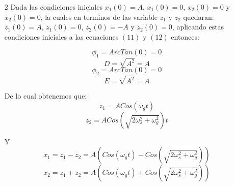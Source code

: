 \documentclass[a4paper]{article}
\begin{document}
\begin{answer}
\begin{enumerate}
    \item[2] Dada las condiciones iniciales $x_1(0) = A$, $\dot{x_1}(0) =0  $, $x_2(0) = 0$ y $\dot{x}_2(0)=0$, la cuales en terminos de las variable $z_1$ y $z_2$ quedaran: 
    $z_1(0) = A$, $\dot{z}_1(0) = 0$, $z_2(0) = -A$ y $\dot{z}_2(0) = 0$, aplicando estas condiciones iniciales a las ecuaciones $(11)$ y $(12)$ entonces:
    
        $$\phi_1 = ArcTan(0) = 0$$
        $$D =\sqrt{A^2} = A$$
        $$\phi_2 = ArcTan(0) = 0$$
        $$E = \sqrt{A^2} = A$$
        
        De lo cual obtenemos que:
        $$ z_1 = ACos(\omega_g t)$$
        $$z_2 = ACos(\sqrt{2\omega_s^2 + \omega_g^2})t$$
        
        Y 
        $$x_1 = z_1 - z_2 = A( Cos(\omega_g t) -Cos(\sqrt{2\omega_s^2 + \omega_g^2}))$$
        $$x_2 = z_1 + z_2 = A( Cos(\omega_g t) + Cos(\sqrt{2\omega_s^2 + \omega_g^2}))$$
        \end{enumerate}
   
    \end{answer}
    
 
    
    

    
\end{document}
